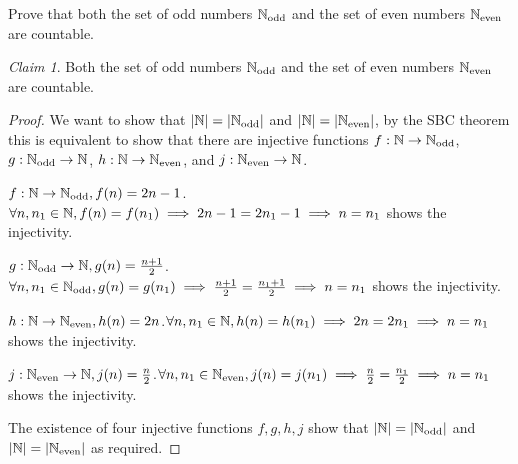 \documentclass{homework}
\newcommand{\T}[1]{\text{#1}}
\newcommand{\N}{\bb{N}} %
\newcommand{\ra}{\rightarrow}
\newcommand{\?}{\stackrel{?}{=}}
\theoremstyle{remark}
\newtheorem*{claim}{Claim}
\begin{document}
\question[1] Prove that both the set of odd numbers $\N_{\T{odd}}$ and the set of even numbers $\N_{\T{even}}$ are countable.
\begin{claim}
    Both the set of odd numbers $\N_{\T{odd}}$ and the set of even numbers $\N_{\T{even}}$ are countable.
\end{claim}
\begin{proof}
    We want to show that $|\N|=|\N_{\T{odd}}|$ and $|\N|=|\N_{\T{even}}|$, by the SBC theorem this is equivalent to show that there are injective functions $f:\N\ra\N_{\T{odd}}$, $g:\N_{\T{odd}}\ra\N$, $h:\N\ra\N_{\T{even}}$, and $j:\N_{\T{even}}\ra\N$. 

    $f:\N\ra\N_{\T{odd}}, f(n)=2n-1$. $\forall n,n_1\in\N, f(n)=f(n_1)\implies 2n-1=2n_1-1\implies n=n_1$ shows the injectivity. 

    $g:\N_{\T{odd}}\ra\N, g(n)=\frac{n+1}{2}$.$\forall n,n_1\in\N_{\T{odd}}, g(n)=g(n_1)\implies \frac{n+1}{2}=\frac{n_1+1}{2}\implies n=n_1$ shows the injectivity. 

    $h:\N\ra\N_{\T{even}}, h(n)=2n$.$\forall n,n_1\in\N, h(n)=h(n_1)\implies 2n=2n_1\implies n=n_1$ shows the injectivity. 

    $j:\N_{\T{even}}\ra\N, j(n)=\frac{n}{2}$.$\forall n,n_1\in\N_{\T{even}}, j(n)=j(n_1)\implies \frac{n}{2}=\frac{n_1}{2}\implies n=n_1$ shows the injectivity. 

    The existence of four injective functions $f,g,h,j$ show that $|\N|=|\N_{\T{odd}}|$ and $|\N|=|\N_{\T{even}}|$ as required. 
\end{proof}
\end{document}

